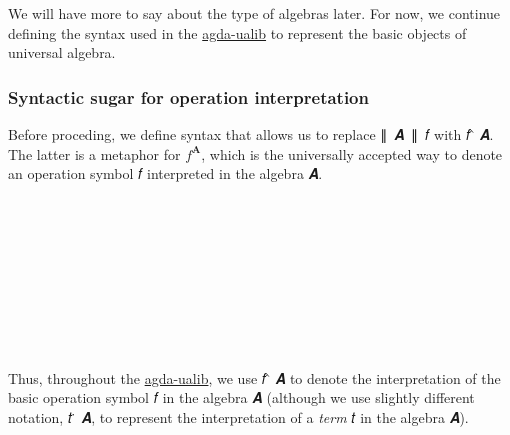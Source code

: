 \documentclass[sigplan,screen]{acmart}
\newcommand{\agdaualib}{\href{https://ualib.org}{agda-ualib}\xspace}
\begin{document}
We will have more to say about the type of algebras later.  For now, we continue defining the syntax used in the \agdaualib to represent the basic objects of universal algebra.

\subsubsection{Syntactic sugar for operation interpretation}
Before proceding, we define syntax that allows us to replace ∥~𝑨~∥~𝑓 with 𝑓 ̂ 𝑨. The latter is a metaphor for \(f^\mathbf{A}\), which is the universally accepted way to denote an operation symbol 𝑓 interpreted in the algebra 𝑨.
\begin{code}%
\>[0]\AgdaSpace{}%
\AgdaModule{\AgdaUnderscore{}}\AgdaSpace{}%
\AgdaSymbol{\{}\AgdaSpace{}%
\AgdaSymbol{:}\AgdaSpace{}%
\AgdaSpace{}%
\AgdaSpace{}%
\AgdaSymbol{\}}%
\>[30]\<%
\\
%
\\[\AgdaEmptyExtraSkip]%
\>[0][@{}l@{\AgdaIndent{0}}]%
\>[1]\AgdaSpace{}%
\AgdaSymbol{:}\AgdaSpace{}%
\AgdaSymbol{(}\AgdaSpace{}%
\AgdaSymbol{:}\AgdaSpace{}%
\AgdaSpace{}%
\AgdaSpace{}%
\AgdaSymbol{)}\<%
\\
\>[1][@{}l@{\AgdaIndent{0}}]%
\>[2]%
\>[6]\AgdaSymbol{(}\AgdaSpace{}%
\AgdaSymbol{:}\AgdaSpace{}%
\AgdaSpace{}%
\AgdaSpace{}%
\AgdaSymbol{)}\<%
\\
%
\>[2]%
\>[6]\AgdaSymbol{(}\AgdaSpace{}%
\AgdaSpace{}%
\AgdaSpace{}%
%
\>[16]%
\>[19]\AgdaSpace{}%
\AgdaSpace{}%
\AgdaSymbol{)}\AgdaSpace{}%
\AgdaSpace{}%
\AgdaSpace{}%
\AgdaSpace{}%
\<%
\\
%
\\[\AgdaEmptyExtraSkip]%
%
\>[1]\AgdaSpace{}%
\AgdaSpace{}%
\AgdaSpace{}%
\AgdaSymbol{=}\AgdaSpace{}%
\AgdaSpace{}%
\AgdaSpace{}%
\AgdaSpace{}%
\AgdaSymbol{(}\AgdaSpace{}%
\AgdaSpace{}%
\AgdaSpace{}%
\AgdaSymbol{)}\AgdaSpace{}%
\<%
\\
%
\\[\AgdaEmptyExtraSkip]%
%
\>[1]\AgdaSpace{}%
\AgdaSpace{}%
\<%
\end{code}
Thus, throughout the \agdaualib, we use 𝑓 ̂ 𝑨 to denote the interpretation of the basic operation symbol 𝑓 in the algebra 𝑨 (although we use slightly different notation, 𝑡 ̇ 𝑨, to represent the interpretation of a \emph{term} 𝑡 in the algebra 𝑨).
\end{document}
